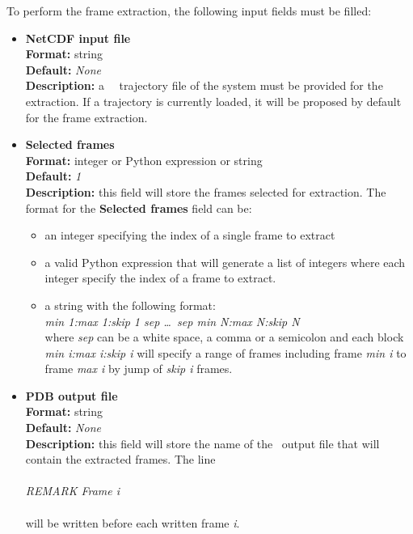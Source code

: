 \documentclass[a4paper,11pt]{report}
\begin{document}
To perform the frame extraction, the following input fields must be filled:
\begin{itemize}
\item \textbf{NetCDF input file}\\
\textbf{Format:} string\\
\textbf{Default:} \textit{None}\\
\textbf{Description:} a \MMTK\ \NetCDF\ trajectory file of the system must be provided for the extraction. 
If a trajectory is currently loaded, it will be proposed by default for the frame extraction.

\item \textbf{Selected frames}\\
\textbf{Format:} integer or Python expression or string\\
\textbf{Default:} \textit{1}\\
\textbf{Description:} this field will store the frames selected for extraction. The format for the \textbf{Selected frames} 
field can be:
\begin{itemize}
\item an integer specifying the index of a single frame to extract
\item a valid Python expression that will generate a list of integers where each integer specify the index of a frame to extract.
\item a string with the following format:\\
\textit{min 1:max 1:skip 1 sep \ldots\ sep min N:max N:skip N}\\
where \textit{sep} can be a white space, a comma or a semicolon and each block \textit{min i:max i:skip i} will specify a 
range of frames including frame \textit{min i} to frame \textit{max i} by jump of \textit{skip i} frames.
\end{itemize}

\item \textbf{PDB output file}\\
\textbf{Format:} string\\
\textbf{Default:} \textit{None}\\
\textbf{Description:} this field will store the name of the \PDB\ output file that will contain the extracted frames. The line
\\\\
\textit{REMARK Frame i}
\\\\
will be written before each written frame \textit{i}.
\end{itemize}
\end{document}
